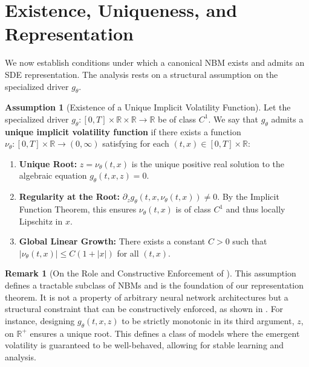 \documentclass[qian]{imsart}
\newcommand{\R}{\mathbb{R}}
\theoremstyle{plain}
\theoremstyle{definition}
\newtheorem{assumption}[theorem]{Assumption}
\newtheorem{remark}[theorem]{Remark}
\begin{document}
\section{Existence, Uniqueness, and Representation}
\label{sec:existence_representation}

We now establish conditions under which a canonical NBM exists and admits an SDE representation. The analysis rests on a structural assumption on the specialized driver $g_\theta$.

\begin{assumption}[Existence of a Unique Implicit Volatility Function]
\label{ass:implicit_vol}
Let the specialized driver $g_\theta: [0,T] \times \R \times \R \to \R$ be of class $C^1$. We say that $g_\theta$ admits a \textbf{unique implicit volatility function} if there exists a function $\nu_\theta: [0,T] \times \R \to (0, \infty)$ satisfying for each $(t,x) \in [0,T] \times \R$:
\begin{enumerate}[label=(\alph*)]
    \item \textbf{Unique Root:} $z = \nu_\theta(t,x)$ is the unique positive real solution to the algebraic equation $g_\theta(t,x,z) = 0$.
    \item \textbf{Regularity at the Root:} $\partial_z g_\theta(t,x,\nu_\theta(t,x)) \neq 0$. By the Implicit Function Theorem, this ensures $\nu_\theta(t,x)$ is of class $C^1$ and thus locally Lipschitz in $x$.
    \item \textbf{Global Linear Growth:} There exists a constant $C > 0$ such that $|\nu_\theta(t,x)| \le C(1+|x|)$ for all $(t,x)$.
\end{enumerate}
\end{assumption}

\begin{remark}[On the Role and Constructive Enforcement of ]
\label{rem:enforcing_assumption}
This assumption defines a tractable subclass of NBMs and is the foundation of our representation theorem. It is not a property of arbitrary neural network architectures but a structural constraint that can be constructively enforced, as shown in . For instance, designing $g_\theta(t,x,z)$ to be strictly monotonic in its third argument, $z$, on $\R^+$ ensures a unique root. This defines a class of models where the emergent volatility is guaranteed to be well-behaved, allowing for stable learning and analysis.
\end{remark}
\end{document}
